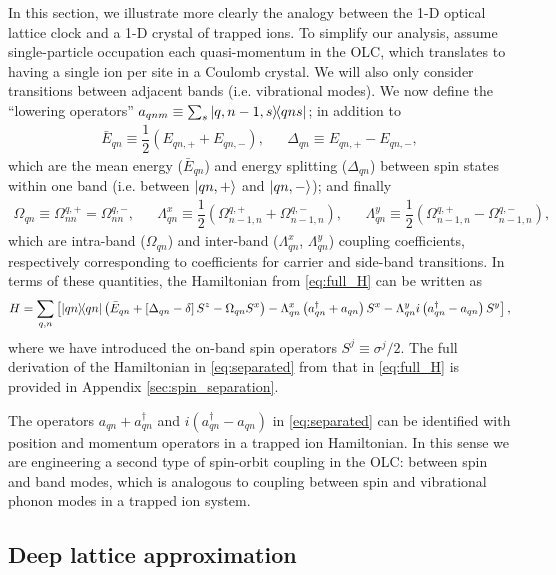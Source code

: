 \documentclass[aps,notitlepage,nofootinbib,11pt]{revtex4-1}
\newcommand{\f}[2]{\dfrac{#1}{#2}} %
\newcommand{\p}[1]{\left(#1\right)} %
\renewcommand{\sp}[1]{\left[#1\right]} %
\newcommand{\1}{\mathds{1}}
\begin{document}
In this section, we illustrate more clearly the analogy between the
1-D optical lattice clock and a 1-D crystal of trapped ions.  To
simplify our analysis, assume single-particle occupation each
quasi-momentum in the OLC, which translates to having a single ion per
site in a Coulomb crystal.  We will also only consider transitions
between adjacent bands (i.e. vibrational modes). We now define the
``lowering operators'' $a_{qnm}\equiv\sum_s\op{q,n-1,s}{qns}$; in
addition to
\begin{align}
  \bar E_{qn} \equiv \f12\p{E_{qn,+} + E_{qn,-}},
  &&
  \Delta_{qn} \equiv E_{qn,+} - E_{qn,-},
\end{align}
which are the mean energy ($\bar E_{qn}$) and energy splitting
($\Delta_{qn}$) between spin states within one band (i.e. between
$\ket{qn,+}$ and $\ket{qn,-}$); and finally
\begin{align}
  \Omega_{qn} \equiv \Omega^{q,+}_{nn} = \Omega^{q,-}_{nn},
  &&
  \Lambda_{qn}^x
  \equiv \f12\p{\Omega^{q,+}_{n-1,n} + \Omega^{q,-}_{n-1,n}},
  &&
  \Lambda_{qn}^y
  \equiv \f12\p{\Omega^{q,+}_{n-1,n} - \Omega^{q,-}_{n-1,n}},
\end{align}
which are intra-band ($\Omega_{qn}$) and inter-band ($\Lambda_{qn}^x$,
$\Lambda_{qn}^y$) coupling coefficients, respectively corresponding to
coefficients for carrier and side-band transitions.  In terms of these
quantities, the Hamiltonian from \eqref{eq:full_H} can be written as
\begin{align}
  H
  = \sum_{q,n} \sp{\op{qn}
    \p{\bar E_{qn} + \sp{\Delta_{qn}-\delta}S^z - \Omega_{qn}S^x}
    - \Lambda_{qn}^x \p{a_{qn}^\dag + a_{qn}}S^x
    - \Lambda_{qn}^y i\p{a_{qn}^\dag - a_{qn}}S^y},
  \label{eq:separated}
\end{align}
where we have introduced the on-band spin operators
$S^j\equiv\sigma^j/2$. The full derivation of the Hamiltonian in
\eqref{eq:separated} from that in \eqref{eq:full_H} is provided in
Appendix \ref{sec:spin_separation}.

The operators $a_{qn}+a_{qn}^\dag$ and $i\p{a_{qn}^\dag-a_{qn}}$ in
\eqref{eq:separated} can be identified with position and momentum
operators in a trapped ion Hamiltonian. In this sense we are
engineering a second type of spin-orbit coupling in the OLC: between
spin and band modes, which is analogous to coupling between spin and
vibrational phonon modes in a trapped ion system.


\subsection{Deep lattice approximation}
\end{document}
